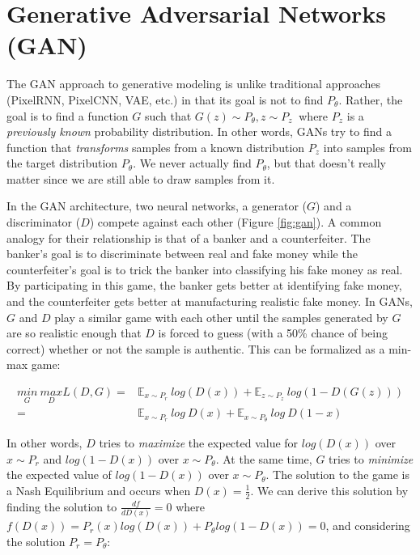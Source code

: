 
\section{Generative Adversarial Networks (GAN)}

The GAN approach to generative modeling is unlike traditional approaches (PixelRNN, PixelCNN, VAE, etc.) in that its goal is not to find $P_\theta$. Rather, the goal is to find a function $G$ such that $G(z) \sim P_\theta, z \sim P_z~$ where $P_z$ is a \textit{previously known} probability distribution. In other words, GANs try to find a function that \textit{transforms} samples from a known distribution $P_z$ into samples from the target distribution $P_\theta$. We never actually find $P_\theta$, but that doesn't really matter since we are still able to draw samples from it. 

In the GAN architecture, two neural networks, a generator ($G$) and a discriminator ($D$) compete against each other (Figure \ref{fig:gan}). A common analogy for their relationship is that of a banker and a counterfeiter. The banker's goal is to discriminate between real and fake money while the counterfeiter's goal is to trick the banker into classifying his fake money as real. By participating in this game, the banker gets better at identifying fake money, and the counterfeiter gets better at manufacturing realistic fake money. In GANs, $G$ and $D$ play a similar game with each other until the samples generated by $G$ are so realistic enough that $D$ is forced to guess (with a 50\% chance of being correct) whether or not the sample is authentic. This can be formalized as a min-max game:

\begin{align}
	\label{eq:minmax}
	\underset{G}{min}~\underset{D}{max} L(D, G) =& \mathbb{E}_{x \sim P_r}~log(D(x)) + \mathbb{E}_{z \sim P_z}~log(1-D(G(z))) \\
	=& \mathbb{E}_{x \sim P_r}~log~D(x) + \mathbb{E}_{x \sim P_\theta}~log~D(1-x)
\end{align}

In other words, $D$ tries to \textit{maximize} the expected value for $log(D(x))$ over $x \sim P_r$ and $log(1-D(x))$ over $x \sim P_\theta$. At the same time, $G$ tries to \textit{minimize} the expected value of $log(1-D(x))$ over $x \sim P_\theta$. The solution to the game is a Nash Equilibrium and occurs when $D(x)=\frac{1}{2}$. We can derive this solution by finding the solution to $\frac{d f}{d D(x)} = 0$ where $f(D(x)) = P_r(x) log(D(x)) + P_\theta log(1-D(x)) = 0$, and considering the solution $P_r = P_\theta$: 

